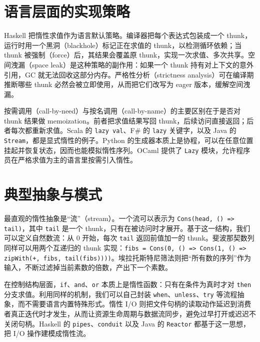 \chapter{语言层面的实现策略}
Haskell 把惰性求值作为语言默认策略。编译器把每个表达式包装成一个 thunk，运行时用一个黑洞（blackhole）标记正在求值的 thunk，以检测循环依赖；当 thunk 被强制（force）后，其结果会覆盖原 thunk，实现一次求值、多次共享。空间洩漏（space leak）是这种策略的副作用：如果一个 thunk 持有对上下文的意外引用，GC 就无法回收这部分内存。严格性分析（strictness analysis）可在编译期推断哪些 thunk 必然会被立即使用，从而把它们改写为 eager 版本，缓解空间洩漏。\par
按需调用（call-by-need）与按名调用（call-by-name）的主要区别在于是否对 thunk 结果做 memoization。前者把求值结果写回 thunk，后续访问直接返回；后者每次都重新求值。Scala 的 \texttt{lazy val}、F\#{} 的 \texttt{lazy} 关键字，以及 Java 的 \texttt{Stream}，都是显式惰性的例子。Python 的生成器本质上是协程，可以在任意位置挂起并恢复状态，因而也能模拟惰性序列。OCaml 提供了 \texttt{Lazy} 模块，允许程序员在严格求值为主的语言里按需引入惰性。\par
\chapter{典型抽象与模式}
最直观的惰性抽象是“流”（stream）。一个流可以表示为 \texttt{Cons(head, () => tail)}，其中 \texttt{tail} 是一个 thunk，只有在被访问时才展开。基于这一结构，我们可以定义自然数流：从 0 开始，每次 \texttt{tail} 返回前值加一的 thunk。斐波那契数列同样可以用两个互递归的 thunk 实现：\texttt{fibs = Cons(0, () => Cons(1, () => zipWith(+, fibs, tail(fibs))))}。埃拉托斯特尼筛法则把“所有数的序列”作为输入，不断过滤掉当前素数的倍数，产出下一个素数。\par
在控制结构层面，\texttt{if}、\texttt{and}、\texttt{or} 本质上是惰性函数：只有在条件为真时才对 \texttt{then} 分支求值。利用同样的机制，我们可以自己封装 \texttt{when}、\texttt{unless}、\texttt{try} 等流程抽象，而不需要语言内置特殊形式。惰性 I/O 则把文件句柄的读取动作延迟到消费者真正迭代时才发生，从而让资源生命周期与数据流同步，避免过早打开或迟迟不关闭句柄。Haskell 的 \texttt{pipes}、\texttt{conduit} 以及 Java 的 \texttt{Reactor} 都基于这一思想，把 I/O 操作建模成惰性流。\par
